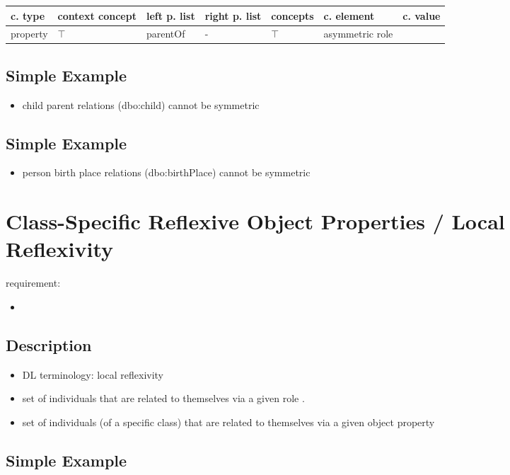 \documentclass{llncs}
\newenvironment{gcotable}{
  \scriptsize
  \sffamily
  \vspace{0.3cm}
  \begin{tabular}{l|l|l|l|l|l|l}
  \hline
  \textbf{c. type} & \textbf{context concept} & \textbf{left p. list} & \textbf{right p. list} & \textbf{concepts} & \textbf{c. element} & \textbf{c. value} \\
  \hline

}{
  \hline
  \end{tabular}
  \linebreak
}
\begin{document}
\begin{gcotable}
property & $\top$ & parentOf & - & $\top$ & asymmetric role \\
\end{gcotable}

\subsection{Simple Example}

\begin{itemize}
	\item child parent relations (dbo:child) cannot be symmetric
\end{itemize}

\subsection{Simple Example}

\begin{itemize}
	\item person birth place relations (dbo:birthPlace) cannot be symmetric
\end{itemize}

\section{Class-Specific Reflexive Object Properties / Local Reflexivity}

requirement:

\begin{itemize}
	\item 
\end{itemize}

\subsection{Description}

\begin{itemize}
  \item DL terminology: local reflexivity
	\item set of individuals that are related to themselves via a given role \cite{Kroetzsch2012}.
	\item set of individuals (of a specific class) that are related to themselves via a given object property
\end{itemize}

\subsection{Simple Example}
\end{document}

